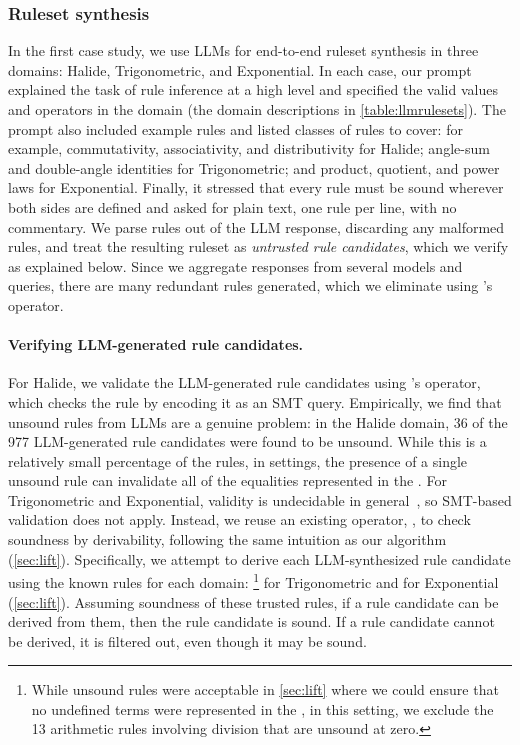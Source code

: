 \subsubsection{Ruleset synthesis}
In the first case study, we use LLMs for end-to-end ruleset synthesis
  in three domains: Halide, Trigonometric, and Exponential.
In each case, our prompt
  explained the task of rule inference at a high level
  and specified the valid values and operators in the domain
  (the domain descriptions in \autoref{table:llmrulesets}).
The prompt also included example rules and listed classes of rules to cover:
  for example, commutativity, associativity, and distributivity for Halide;
  angle-sum and double-angle identities for Trigonometric;
  and product, quotient, and power laws for Exponential.
Finally, it stressed that every rule must be sound wherever both sides
  are defined and asked for plain text, one rule per line, with no commentary.
We parse rules out of the LLM response, discarding any malformed
  rules, and treat the resulting ruleset as \textit{untrusted rule candidates},
  which we verify as explained below.
Since we aggregate responses from several models and queries,
  there are many redundant rules generated, which
  we eliminate using \enumo's  operator.

\paragraph*{Verifying LLM-generated rule candidates.}
For Halide, we validate the LLM-generated rule candidates using
  \enumo's  operator,
  which checks the rule by encoding it as an SMT query.
Empirically, we find that unsound rules from LLMs are a genuine problem:
  in the Halide domain, 36 of the 977 LLM-generated rule candidates were
  found to be unsound.
While this is a relatively small percentage of the rules, in \eqsat settings,
  the presence of a single unsound rule can invalidate all of the
  equalities represented in the \egraph.
For Trigonometric and Exponential, validity
  is undecidable in general~\citep{dreal},
  so SMT-based validation does not apply.
Instead, we reuse an existing \enumo operator, ,
  to check soundness by derivability,
  following the same intuition as our \ff algorithm (\autoref{sec:lift}).
Specifically, we attempt to derive each
  LLM-synthesized rule candidate using
  the known rules for each domain: \footnote{
    While unsound rules were acceptable in \autoref{sec:lift} where we could ensure
    that no undefined terms were represented in the \egraph, in this setting,
    we exclude the 13 arithmetic rules involving division that are unsound at zero.
  }  for Trigonometric and 
  for Exponential (\autoref{sec:lift}).
Assuming soundness of these trusted rules,
  if a rule candidate can be derived
  from them,
  then the rule candidate is sound.
If a rule candidate cannot be derived, it is filtered out,
  even though it may be sound.


